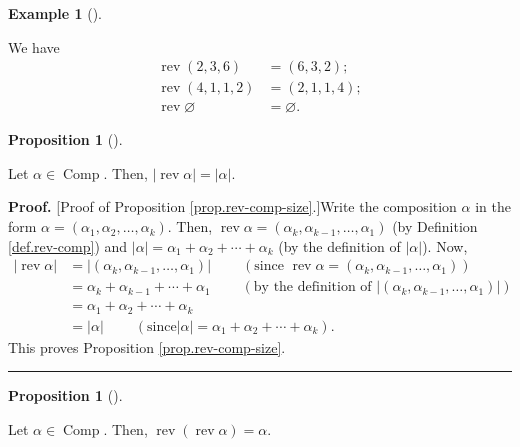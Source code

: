 \documentclass[numbers=enddot,12pt,final,onecolumn,notitlepage]{scrartcl}%
\theoremstyle{definition}
\newtheorem{prop}[theo]{Proposition}
\newenvironment{proposition}[1][]
{\begin{prop}[#1]\begin{leftbar}}
{\end{leftbar}\end{prop}}
\newtheorem{exam}[theo]{Example}
\newenvironment{example}[1][]
{\begin{exam}[#1]\begin{leftbar}}
{\end{leftbar}\end{exam}}
\newenvironment{proof}[1][Proof]{\noindent\textbf{#1.} }{\ \rule{0.5em}{0.5em}}
\begin{document}
\begin{example}
We have%
\begin{align*}
\operatorname*{rev}\left(  2,3,6\right)   &  =\left(  6,3,2\right)  ;\\
\operatorname*{rev}\left(  4,1,1,2\right)   &  =\left(  2,1,1,4\right)  ;\\
\operatorname*{rev}\varnothing &  =\varnothing.
\end{align*}

\end{example}

\begin{proposition}
\label{prop.rev-comp-size}Let $\alpha\in\operatorname*{Comp}$. Then,
$\left\vert \operatorname*{rev}\alpha\right\vert =\left\vert \alpha\right\vert
$.
\end{proposition}

\begin{proof}
[Proof of Proposition \ref{prop.rev-comp-size}.]Write the composition $\alpha$
in the form $\alpha=\left(  \alpha_{1},\alpha_{2},\ldots,\alpha_{k}\right)  $.
Then, $\operatorname*{rev}\alpha=\left(  \alpha_{k},\alpha_{k-1},\ldots
,\alpha_{1}\right)  $ (by Definition \ref{def.rev-comp}) and $\left\vert
\alpha\right\vert =\alpha_{1}+\alpha_{2}+\cdots+\alpha_{k}$ (by the definition
of $\left\vert \alpha\right\vert $). Now,%
\begin{align*}
\left\vert \operatorname*{rev}\alpha\right\vert  &  =\left\vert \left(
\alpha_{k},\alpha_{k-1},\ldots,\alpha_{1}\right)  \right\vert
\ \ \ \ \ \ \ \ \ \ \left(  \text{since }\operatorname*{rev}\alpha=\left(
\alpha_{k},\alpha_{k-1},\ldots,\alpha_{1}\right)  \right) \\
&  =\alpha_{k}+\alpha_{k-1}+\cdots+\alpha_{1}\ \ \ \ \ \ \ \ \ \ \left(
\text{by the definition of }\left\vert \left(  \alpha_{k},\alpha_{k-1}%
,\ldots,\alpha_{1}\right)  \right\vert \right) \\
&  =\alpha_{1}+\alpha_{2}+\cdots+\alpha_{k}\\
&  =\left\vert \alpha\right\vert \ \ \ \ \ \ \ \ \ \ \left(  \text{since
}\left\vert \alpha\right\vert =\alpha_{1}+\alpha_{2}+\cdots+\alpha_{k}\right)
.
\end{align*}
This proves Proposition \ref{prop.rev-comp-size}.
\end{proof}

\begin{proposition}
\label{prop.rev-rev}Let $\alpha\in\operatorname*{Comp}$. Then,
$\operatorname*{rev}\left(  \operatorname*{rev}\alpha\right)  =\alpha$.
\end{proposition}
\end{document}
